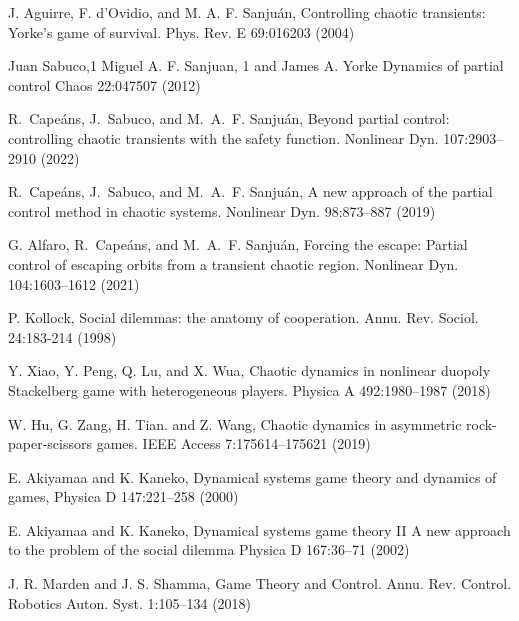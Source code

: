 \begin{thebibliography}{04}





J. Aguirre, F. d’Ovidio, and M. A. F. Sanjuán,
Controlling chaotic transients: Yorke’s game of survival.
Phys. Rev. E 69:016203
(2004)

Juan Sabuco,1 Miguel A. F. Sanjuan,  1 and James A. Yorke
Dynamics of partial control
Chaos 22:047507
(2012)

R.~Cape{\'a}ns, J.~Sabuco, and M.~A.~F. Sanju{\'a}n, 
Beyond partial control: controlling chaotic transients
with the safety function.
Nonlinear Dyn. 107:2903–2910
(2022)


R.~Cape{\'a}ns, J.~Sabuco, and M.~A.~F. Sanju{\'a}n, 
A new approach of the partial control method in chaotic systems.
Nonlinear Dyn. 98:873--887
(2019)


G. Alfaro, R.~Cape{\'a}ns, and M.~A.~F. Sanju{\'a}n, 
Forcing the escape: Partial control of escaping orbits from a
transient chaotic region.
Nonlinear Dyn. 104:1603–1612
(2021) 






P. Kollock,
Social dilemmas: the anatomy of cooperation.
Annu. Rev. Sociol. 24:183-214
(1998)

Y. Xiao, Y. Peng, Q. Lu, and X. Wua,
Chaotic dynamics in nonlinear duopoly Stackelberg game
with heterogeneous players.
Physica A 492:1980--1987
(2018)

W. Hu, G. Zang, H. Tian. and Z. Wang,
Chaotic dynamics in asymmetric rock-paper-scissors games.
IEEE Access 7:175614--175621
(2019)


E. Akiyamaa and K. Kaneko,
Dynamical systems game theory and dynamics of games,
Physica D 147:221--258
(2000)

E. Akiyamaa and K. Kaneko,
Dynamical systems game theory II
A new approach to the problem of the social dilemma
Physica D 167:36--71
(2002)


J. R. Marden and J. S. Shamma,
Game Theory and Control.
 Annu. Rev. Control. Robotics Auton. Syst. 1:105--134
(2018)


\end{thebibliography}
